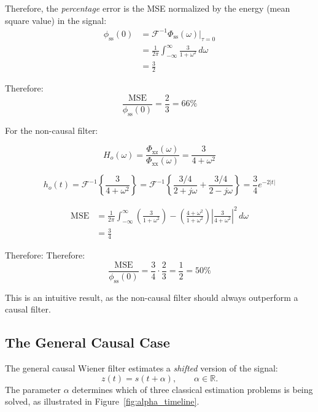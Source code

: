 \documentclass[12pt]{book}
\theoremstyle{definition}
\newcommand{\F}{\mathcal{F}}
\begin{document}
Therefore, the \emph{percentage} error is the MSE normalized by the energy (mean square value) in the signal:
\[
\begin{aligned}
    \phi_\mathrm{ss}(0) & = \mathcal{F}^{-1}{\Phi_\mathrm{ss}}(\omega)|_{\tau=0}\\
            & = \frac{1}{2 \pi} \int_{-\infty}^\infty \frac{3}{1 + \omega^2} \, d \omega \\
            & = \frac{3}{2}
\end{aligned}
\]

Therefore:
\[
\frac{\text{MSE}}{\phi_\mathrm{ss}(0)} = \frac{2}{3} = 66\%
\]

\bigskip
For the non-causal filter:

\[
H_o(\omega) = \frac{\Phi_\mathrm{xz}(\omega)}{\Phi_\mathrm{xx}(\omega)} = \frac{3}{4 + \omega^2}
\]

\[
h_o(t) = \mathcal{F}^{-1} \left \{ \frac{3}{4 + \omega^2} \right \} = \mathcal{F}^{-1} \left \{ \frac{3/4}{2 + j\omega} + \frac{3/4}{2 - j\omega} \right \} = \frac{3}{4}e^{-2|t|}
\]

\[
\begin{aligned}    
\text{MSE} & = \frac{1}{2 \pi} \int_{-\infty}^\infty \left (\frac{3}{1 + \omega^2} \right )  - \left ( \frac{4+\omega^2}{1+\omega^2} \right) \left | \frac{3}{4 + \omega^2} \right |^2  \, d \omega \\
        & = \frac{3}{4}
\end{aligned}
\]

Therefore:
Therefore:
\[
\frac{\text{MSE}}{\phi_\mathrm{ss}(0)} = \frac{3}{4}\cdot \frac{2}{3} = \frac{1}{2}= 50\%
\]

This is an intuitive result, as the non-causal filter should always outperform a causal filter.

\bigskip

\subsection{The General Causal Case}
\label{sec:general-causal}

\providecommand{\F}{\mathcal{F}}      %

The general causal Wiener filter estimates a \emph{shifted} version of the
signal:
\[
  z(t) = s(t+\alpha), \qquad \alpha \in \mathbb{R}.
\]
The parameter $\alpha$ determines which of three classical estimation problems
is being solved, as illustrated in Figure~\ref{fig:alpha_timeline}.
\end{document}
